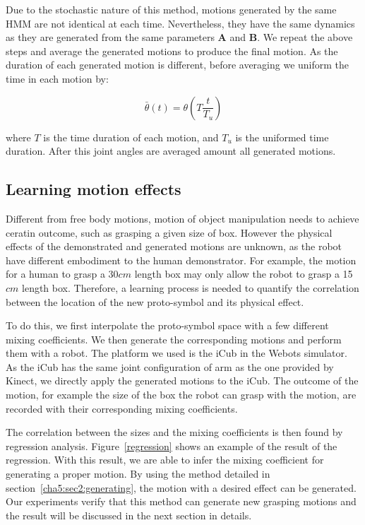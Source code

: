 Due to the stochastic nature of this method, motions generated by the same HMM are not identical at each time. Nevertheless, they have the same dynamics as they are generated from the same parameters $\boldsymbol{A}$ and $\boldsymbol{B}$. We repeat the above steps and average the generated motions to produce the final motion. As the duration of each generated motion is different, before averaging we uniform the time in each motion by:

\begin{equation}
\bar{\theta}\left(t\right)=\theta\left(T\frac{t}{T_u}\right)
\end{equation}

where $T$ is the time duration of each motion, and $T_u$ is the uniformed time duration. After this joint angles are averaged amount all generated motions.

\subsection{Learning motion effects}
\label{cha5:sec2:learning}

Different from free body motions, motion of object manipulation needs to achieve ceratin outcome, such as grasping a given size of box. However the physical effects of the demonstrated and generated motions are unknown, as the robot have different embodiment to the human demonstrator. For example, the motion for a human to grasp a 30$cm$ length box may only allow the robot to grasp a 15$cm$ length box. Therefore, a learning process is needed to quantify the correlation between the location of the new proto-symbol and its physical effect.

To do this, we first interpolate the proto-symbol space with a few different mixing coefficients. We then generate the corresponding motions and perform them with a robot. The platform we used is the iCub in the Webots simulator. As the iCub has the same joint configuration of arm as the one provided by Kinect, we directly apply the generated motions to the iCub.  The outcome of the motion, for example the size of the box the robot can grasp with the motion, are recorded with their corresponding mixing coefficients.

The correlation between the sizes and the mixing coefficients is then found by regression analysis. Figure~\ref{regression} shows an example of the result of the regression. With this result, we are able to infer the mixing coefficient for generating a proper motion. By using the method detailed in section~\ref{cha5:sec2:generating}, the motion with a desired effect can be generated. Our experiments verify that this method can generate new grasping motions and the result will be discussed in the next section in details. 
